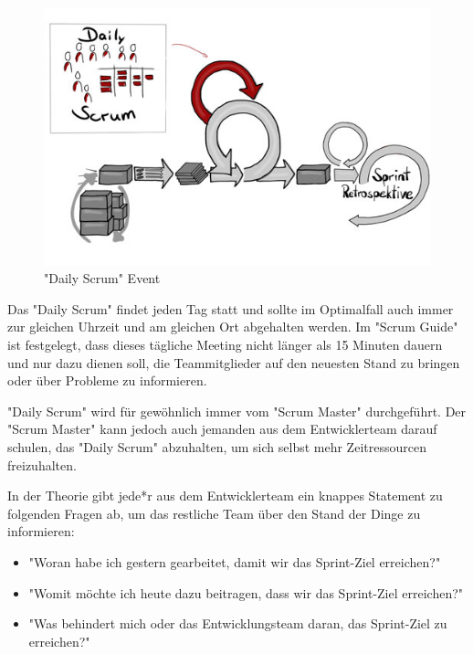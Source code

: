 \begin{figure}[H]
    \centering
    \includegraphics[width=\textwidth]{media/ProjectManagement/DailyScrum.jpg}
    \caption{"Daily Scrum" Event \cite{DailyScrumBild}}
\end{figure}

Das "Daily Scrum" findet jeden Tag statt und sollte im Optimalfall auch immer  zur gleichen Uhrzeit und am gleichen Ort abgehalten werden. Im "Scrum Guide" ist festgelegt, dass dieses tägliche Meeting nicht länger als 15 Minuten dauern und nur dazu dienen soll, die Teammitglieder auf den neuesten Stand zu bringen oder über Probleme zu informieren. \cite{DailyScrum}

"Daily Scrum" wird für gewöhnlich immer vom "Scrum Master" durchgeführt. Der "Scrum Master" kann jedoch auch jemanden aus dem Entwicklerteam darauf schulen, das "Daily Scrum" abzuhalten, um sich selbst mehr Zeitressourcen freizuhalten. \cite{DailyScrum}

In der Theorie gibt jede*r aus dem Entwicklerteam ein knappes Statement zu folgenden Fragen ab, um das restliche Team über den Stand der Dinge zu informieren:

\begin{itemize}
    \item "Woran habe ich gestern gearbeitet, damit wir das Sprint-Ziel erreichen?" \cite{DailyScrum}
    \item "Womit möchte ich heute dazu beitragen, dass wir das Sprint-Ziel erreichen?" \cite{DailyScrum}
    \item "Was behindert mich oder das Entwicklungsteam daran, das Sprint-Ziel zu erreichen?" \cite{DailyScrum}
\end{itemize}


